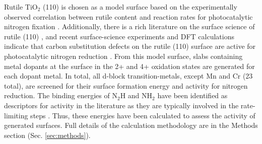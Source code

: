 Rutile TiO$_2$ (110) is chosen as a model surface based on the experimentally observed correlation between rutile content and reaction rates for photocatalytic nitrogen fixation \cite{Schrauzer_1977}. Additionally, there is a rich literature on the surface science of rutile (110) \cite{Diebold_2003, Yates_1991, Lu1994, Walle2009}, and recent surface-science experiments and DFT calculations indicate that carbon substitution defects on the rutile (110) surface are active for photocatalytic nitrogen reduction \cite{Comer_2018b}. From this model surface, slabs containing metal dopants at the surface in the 2+ and 4+ oxidation states are generated for each dopant metal.
In total, all d-block transition-metals, except Mn and Cr (23 total), are screened for their surface formation energy and activity for nitrogen reduction.  The binding energies of N$_2$H and NH$_2$ have been identified as descriptors for activity in the literature as they are typically involved in the rate-limiting steps \cite{Hoskuldsson_2017, Montoya_2015, Comer_2018}. Thus, these energies have been calculated to assess the activity of generated surfaces.  Full details of the calculation methodology are in the Methods section (Sec. \ref{sec:methods}).


